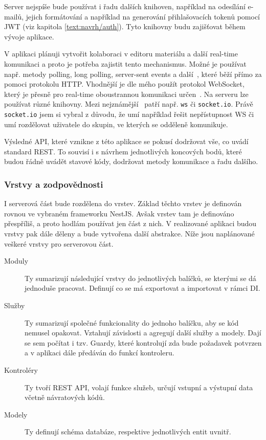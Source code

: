 Server nejspíše bude používat i řadu dalších knihoven, například na odesílání e-mailů, jejich formátování a například na generování přihlašovacích tokenů pomocí JWT (viz kapitola \ref{text:navrh/auth}).
Tyto knihovny budu zajišťovat během vývoje aplikace.

V aplikaci plánuji vytvořit kolaboraci v editoru materiálu a další real-time komunikaci a proto je potřeba zajistit tento mechanismus.
Možné je používat např. metody polling, long polling, server-sent events a další~\cite{subramanian_2021}, které běží přímo za pomoci protokolu HTTP.
Vhodnější je dle mého použít protokol WebSocket, který je přesně pro real-time oboustrannou komunikaci určen~\cite{rfc6455}.
Na serveru lze používat různé knihovny.
Mezi nejznámější~\cite{uzayr2022frontend} patří např. \verb|ws| či \verb|socket.io|.
Právě \verb|socket.io| jsem si vybral z důvodu, že umí například řešit nepřístupnost WS či umí rozdělovat uživatele do skupin, ve kterých se odděleně komunikuje.

Výsledné API, které vznikne z této aplikace se pokusí dodržovat vše, co uvádí standard REST.
To souvisí i s návrhem jednotlivých koncových bodů, které budou řádně uvádět stavové kódy, dodržovat metody komunikace a řadu dalšího.

\subsubsection{Vrstvy a zodpovědnosti}

I serverová část bude rozdělena do vrstev. 
Základ těchto vrstev je definován rovnou ve vybraném frameworku NestJS.
Avšak vrstev tam je definováno přespříliš, a proto hodlám používat jen část z nich.
V realizované aplikaci budou vrstvy pak dále děleny a bude vytvořena další abstrakce.
Níže jsou naplánované veškeré vrstvy pro serverovou část.

\begin{description}
    \item[Moduly] Ty sumarizují následující vrstvy do jednotlivých balíčků, se kterými se dá jednoduše pracovat. Definují co se má exportovat a importovat v rámci DI.
    \item[Služby] Ty sumarizují společné funkcionality do jednoho balíčku, aby se kód nemusel opakovat. Vztahují závislosti a agregují další služby a modely. Dají se sem počítat i tzv. Guardy, které kontrolují zda bude požadavek potvrzen a v aplikaci dále předáván do funkcí kontroleru.
    \item[Kontroléry] Ty tvoří REST API, volají funkce služeb, určují vstupní a výstupní data včetně návratových kódů.
    \item[Modely] Ty definují schéma databáze, respektive jednotlivých entit uvnitř.
\end{description}


